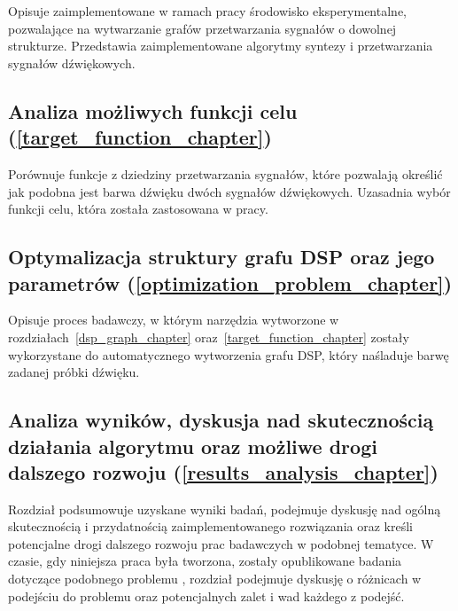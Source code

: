 Opisuje zaimplementowane w ramach pracy środowisko eksperymentalne, pozwalające na wytwarzanie
grafów przetwarzania sygnałów o dowolnej strukturze. Przedstawia zaimplementowane algorytmy syntezy i przetwarzania sygnałów dźwiękowych.

\subsection*{Analiza możliwych funkcji celu (\ref{target_function_chapter}) }

Porównuje funkcje z dziedziny przetwarzania sygnałów, które pozwalają określić jak podobna jest barwa dźwięku dwóch sygnałów dźwiękowych.
Uzasadnia wybór funkcji celu, która została zastosowana w pracy.

\subsection*{Optymalizacja struktury grafu DSP oraz jego parametrów (\ref{optimization_problem_chapter}) }

Opisuje proces badawczy, w którym narzędzia wytworzone w rozdziałach~\ref{dsp_graph_chapter} oraz~\ref{target_function_chapter}
zostały wykorzystane do automatycznego wytworzenia grafu DSP, który naśladuje barwę zadanej próbki dźwięku.

\subsection*{Analiza wyników, dyskusja nad skutecznością działania algorytmu oraz możliwe drogi dalszego rozwoju (\ref{results_analysis_chapter})}

Rozdział podsumowuje uzyskane wyniki badań, podejmuje dyskusję nad ogólną skutecznością i przydatnością zaimplementowanego rozwiązania oraz
kreśli potencjalne drogi dalszego rozwoju prac badawczych w podobnej tematyce. W czasie, gdy niniejsza praca była tworzona, zostały opublikowane badania
dotyczące podobnego problemu \cite{ieee_synth_programming}, rozdział podejmuje dyskusję o różnicach w podejściu do problemu oraz potencjalnych
zalet i wad każdego z podejść.

